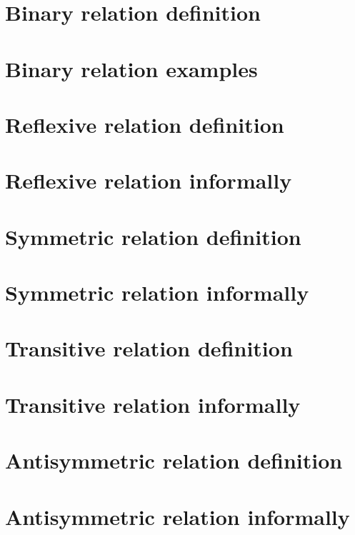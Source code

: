 
\section*{Binary relation definition}

\vfill
\section*{Binary relation examples}

\vfill
\section*{Reflexive relation definition}

\vfill
\section*{Reflexive relation informally}

\vfill
\section*{Symmetric relation definition}

\vfill
\section*{Symmetric relation informally}

\vfill
\section*{Transitive relation definition}

\vfill
\section*{Transitive relation informally}

\vfill
\section*{Antisymmetric relation definition}

\vfill
\section*{Antisymmetric relation informally}

\vfill
